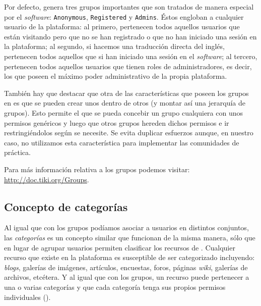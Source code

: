Por defecto, \tiki{} genera tres grupos importantes que son tratados de manera especial por el \textit{software}: \texttt{Anonymous}, \texttt{Registered} y \texttt{Admins}. Éstos engloban a cualquier usuario de la plataforma: al primero, pertenecen todos aquellos usuarios que están visitando \tiki{} pero que no se han registrado o que no han iniciado una sesión en la plataforma; al segundo, si hacemos una traducción directa del inglés, pertenecen todos aquellos que si han iniciado una sesión en el \textit{software}; al tercero, pertenecen todos aquellos usuarios que tienen roles de administradores, es decir, los que poseen el máximo poder administrativo de la propia plataforma.  

También hay que destacar que otra de las características que poseen los grupos en \tiki{} es que se pueden crear unos dentro de otros (y montar así una jerarquía de grupos). Esto permite el que se pueda concebir un grupo cualquiera con unos permisos genéricos y luego que otros grupos hereden dichos permisos e ir restringiéndolos según se necesite. Se evita duplicar esfuerzos aunque, en nuestro caso, no utilizamos esta característica para implementar las comunidades de práctica. 

Para más información relativa a los grupos podemos visitar: \url{http://doc.tiki.org/Groups}.

\subsection{Concepto de categorías}

Al igual que con los grupos podíamos asociar a usuarios en distintos conjuntos, las \textit{categorías} es un concepto similar que funcionan de la misma manera, sólo que en lugar de agrupar usuarios permiten clasificar los recursos de \tiki{}. Cualquier recurso que existe en la plataforma es susceptible de ser categorizado incluyendo: \textit{blogs}, galerías de imágenes, artículos, encuestas, foros, páginas \textit{wiki}, galerías de archivos, etcétera. Y al igual que con los grupos, un recurso puede pertenecer a una o varias categorías y que cada categoría tenga sus propios permisos individuales ().

